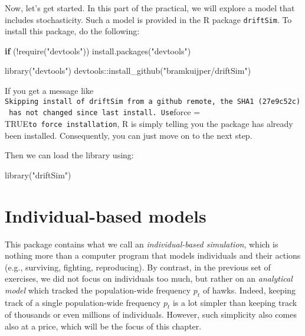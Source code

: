 \documentclass[
]{book}
\newenvironment{Shaded}{\begin{snugshade}}{\end{snugshade}}
\newcommand{\ControlFlowTok}[1]{\textcolor[rgb]{0.13,0.29,0.53}{\textbf{#1}}}
\newcommand{\FunctionTok}[1]{\textcolor[rgb]{0.00,0.00,0.00}{#1}}
\newcommand{\NormalTok}[1]{#1}
\newcommand{\SpecialCharTok}[1]{\textcolor[rgb]{0.00,0.00,0.00}{#1}}
\newcommand{\StringTok}[1]{\textcolor[rgb]{0.31,0.60,0.02}{#1}}
\begin{document}
Now, let's get started. In this part of the practical, we will explore a model that includes stochasticity. Such a model is provided in the R package \texttt{driftSim}. To install this package, do the following:

\begin{Shaded}
\begin{Highlighting}[]
\ControlFlowTok{if}\NormalTok{ (}\SpecialCharTok{!}\FunctionTok{require}\NormalTok{(}\StringTok{"devtools"}\NormalTok{)) }\FunctionTok{install.packages}\NormalTok{(}\StringTok{"devtools"}\NormalTok{)}

\FunctionTok{library}\NormalTok{(}\StringTok{"devtools"}\NormalTok{) }
\NormalTok{devtools}\SpecialCharTok{::}\FunctionTok{install\_github}\NormalTok{(}\StringTok{"bramkuijper/driftSim"}\NormalTok{)}
\end{Highlighting}
\end{Shaded}

If you get a message like \texttt{Skipping\ install\ of\ \textquotesingle{}driftSim\textquotesingle{}\ from\ a\ github\ remote,\ the\ SHA1\ (27e9c52c)\ has\ not\ changed\ since\ last\ install.\ Use}force = TRUE\texttt{to\ force\ installation}, R is simply telling you the package has already been installed. Consequently, you can just move on to the next step.

Then we can load the library using:

\begin{Shaded}
\begin{Highlighting}[]
\FunctionTok{library}\NormalTok{(}\StringTok{"driftSim"}\NormalTok{)}
\end{Highlighting}
\end{Shaded}

\hypertarget{individual-based-models}{%
\section{Individual-based models}\label{individual-based-models}}

This package contains what we call an \emph{individual-based simulation}, which is nothing more than a computer program that models individuals and their actions (e.g., surviving, fighting, reproducing). By contrast, in the previous set of exercises, we did not focus on individuals too much, but rather on an \emph{analytical model} which tracked the population-wide frequency \(p_{t}\) of hawks. Indeed, keeping track of a single population-wide frequency \(p_{t}\) is a lot simpler than keeping track of thousands or even millions of individuals. However, such simplicity also comes also at a price, which will be the focus of this chapter.
\end{document}
